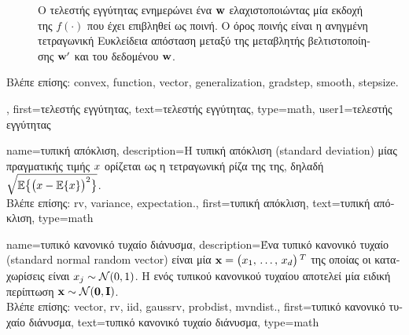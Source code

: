{{\begin{figure}[H]
			{
			\caption{\foreignlanguage{greek}{Ο τελεστής εγγύτητας ενημερώνει ένα}  ${\bf w}$ 
				\foreignlanguage{greek}{ελαχιστοποιώντας μία εκδοχή της}  $f(\cdot)$ \foreignlanguage{greek}{που έχει 
				επιβληθεί ως ποινή. Ο όρος ποινής είναι η ανηγμένη τετραγωνική Ευκλείδεια απόσταση μεταξύ της μεταβλητής 
				βελτιστοποίησης ${\bf w}'$ και του δεδομένου}  ${\bf w}$.	\label{fig_proxoperator_opt_dict}} }
		\end{figure}
		\foreignlanguage{greek}{Βλέπε επίσης:} \gls{convex}, \gls{function}, \gls{vector}, \gls{generalization}, \gls{gradstep}, \gls{smooth}, \gls{stepsize}.},
	first={\foreignlanguage{greek}{τελεστής εγγύτητας}},
	text={\foreignlanguage{greek}{τελεστής εγγύτητας}},
	type=math,
	user1={\foreignlanguage{greek}{τελεστής εγγύτητας}} %
}%

{name={\foreignlanguage{greek}{τυπική απόκλιση}},
	description={\foreignlanguage{greek}{Η τυπική απόκλιση} (standard deviation) 
		\foreignlanguage{greek}{μίας}  \foreignlanguage{greek}{πραγματικής τιμής $x$ ορίζεται ως η 
		τετραγωνική ρίζα της}  \foreignlanguage{greek}{της, δηλαδή}
		$\sqrt{\mathbb{E}\big\{ \big( x - \mathbb{E}\{x \} \big)^{2} \big\}}$. 
		\\
    		\foreignlanguage{greek}{Βλέπε επίσης:} \gls{rv}, \gls{variance}, \gls{expectation}.},
	first={\foreignlanguage{greek}{τυπική απόκλιση}},
	text={\foreignlanguage{greek}{τυπική απόκλιση}},
	type=math
}

{name={\foreignlanguage{greek}{τυπικό κανονικό τυχαίο διάνυσμα}}, 
	description={\foreignlanguage{greek}{Ένα τυπικό κανονικό τυχαίο}  
		 (standard normal random vector) \foreignlanguage{greek}{είναι μία}  
		${\bf x}=\big(x_{1}, \,\ldots, \,x_{d}\big)\,^{T}$ 
		\foreignlanguage{greek}{της οποίας οι καταχωρίσεις είναι}   $x_{j} \sim \mathcal{N}(0,1)$. 
		\foreignlanguage{greek}{Η}  \foreignlanguage{greek}{ενός τυπικού κανονικού τυχαίου}  
		\foreignlanguage{greek}{αποτελεί μία ειδική περίπτωση}  ${\bf x} \sim \mathcal{N}(\mathbf{0},\mathbf{I})$.
		\\ 
		\foreignlanguage{greek}{Βλέπε επίσης:} \gls{vector}, \gls{rv}, \gls{iid}, \gls{gaussrv}, \gls{probdist}, \gls{mvndist}.}, 
	first={\foreignlanguage{greek}{τυπικό κανονικό τυχαίο διάνυσμα}},
	text={\foreignlanguage{greek}{τυπικό κανονικό τυχαίο διάνυσμα}},
	type=math
}

